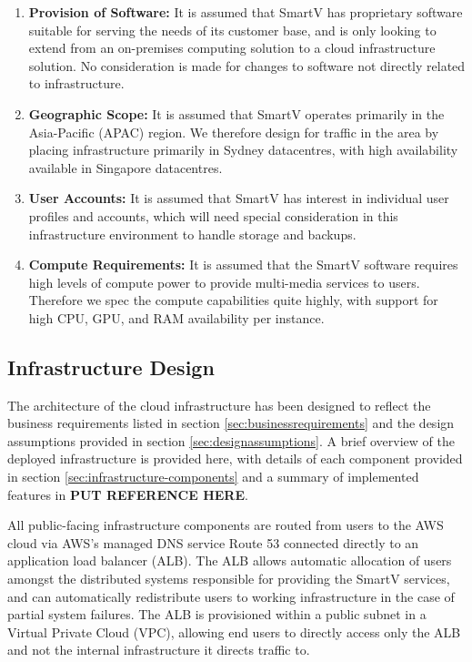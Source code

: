 \begin{enumerate}
    \item \textbf{Provision of Software:} It is assumed that SmartV has proprietary software suitable for serving the needs of its customer base, and is only looking to extend from an on-premises computing solution to a cloud infrastructure solution. No consideration is made for changes to software not directly related to infrastructure.
    \item \textbf{Geographic Scope:} It is assumed that SmartV operates primarily in the Asia-Pacific (APAC) region. We therefore design for traffic in the area by placing infrastructure primarily in Sydney datacentres, with high availability available in Singapore datacentres.
    \item \textbf{User Accounts:} It is assumed that SmartV has interest in individual user profiles and accounts, which will need special consideration in this infrastructure environment to handle storage and backups.
    \item \textbf{Compute Requirements:} It is assumed that the SmartV software requires high levels of compute power to provide multi-media services to users. Therefore we spec the compute capabilities quite highly, with support for high CPU, GPU, and RAM availability per instance.
\end{enumerate}

\subsection{Infrastructure Design}

The architecture of the cloud infrastructure has been designed to reflect the business requirements listed in section \ref{sec:businessrequirements} and the design assumptions provided in section \ref{sec:designassumptions}. A brief overview of the deployed infrastructure is provided here, with details of each component provided in section \ref{sec:infrastructure-components} and a summary of implemented features in \textbf{PUT REFERENCE HERE}.

All public-facing infrastructure components are routed from users to the AWS cloud via AWS's managed DNS service Route 53 connected directly to an application load balancer (ALB). The ALB allows automatic allocation of users amongst the distributed systems responsible for providing the SmartV services, and can automatically redistribute users to working infrastructure in the case of partial system failures. The ALB is provisioned within a public subnet in a Virtual Private Cloud (VPC), allowing end users to directly access only the ALB and not the internal infrastructure it directs traffic to.

